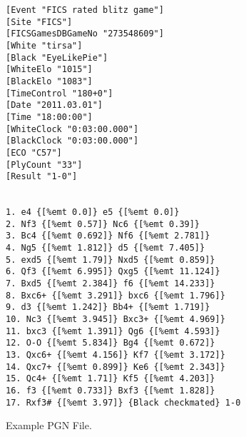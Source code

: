 \documentclass{article}
\begin{document}
\begin{figure}[tph]
\begin{verbatim}
[Event "FICS rated blitz game"]
[Site "FICS"]
[FICSGamesDBGameNo "273548609"]
[White "tirsa"]
[Black "EyeLikePie"]
[WhiteElo "1015"]
[BlackElo "1083"]
[TimeControl "180+0"]
[Date "2011.03.01"]
[Time "18:00:00"]
[WhiteClock "0:03:00.000"]
[BlackClock "0:03:00.000"]
[ECO "C57"]
[PlyCount "33"]
[Result "1-0"]


1. e4 {[%emt 0.0]} e5 {[%emt 0.0]} 
2. Nf3 {[%emt 0.57]} Nc6 {[%emt 0.39]} 
3. Bc4 {[%emt 0.692]} Nf6 {[%emt 2.781]} 
4. Ng5 {[%emt 1.812]} d5 {[%emt 7.405]} 
5. exd5 {[%emt 1.79]} Nxd5 {[%emt 0.859]} 
6. Qf3 {[%emt 6.995]} Qxg5 {[%emt 11.124]} 
7. Bxd5 {[%emt 2.384]} f6 {[%emt 14.233]} 
8. Bxc6+ {[%emt 3.291]} bxc6 {[%emt 1.796]} 
9. d3 {[%emt 1.242]} Bb4+ {[%emt 1.719]} 
10. Nc3 {[%emt 3.945]} Bxc3+ {[%emt 4.969]} 
11. bxc3 {[%emt 1.391]} Qg6 {[%emt 4.593]} 
12. O-O {[%emt 5.834]} Bg4 {[%emt 0.672]} 
13. Qxc6+ {[%emt 4.156]} Kf7 {[%emt 3.172]} 
14. Qxc7+ {[%emt 0.899]} Ke6 {[%emt 2.343]} 
15. Qc4+ {[%emt 1.71]} Kf5 {[%emt 4.203]} 
16. f3 {[%emt 0.733]} Bxf3 {[%emt 1.828]} 
17. Rxf3# {[%emt 3.97]} {Black checkmated} 1-0

\end{verbatim}

\caption{Example PGN File.}
\label{fig:pgn}
\end{figure}
\end{document}
